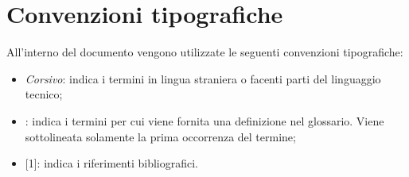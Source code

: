 \section{Convenzioni tipografiche}
All’interno del documento vengono utilizzate le seguenti convenzioni tipografiche:
\begin{itemize}
    \item \emph{Corsivo}: indica i termini in lingua straniera o facenti parti del linguaggio tecnico;
    \item {} : indica i termini per cui viene fornita una definizione nel glossario. Viene sottolineata solamente la prima occorrenza del termine;
    \item {[1]}: indica i riferimenti bibliografici.
\end{itemize}